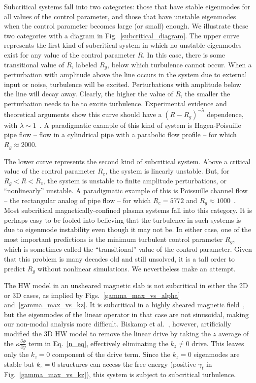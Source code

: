 \documentclass[twocolumn,showkeys,superscriptaddress]{revtex4}
\newcommand{\pdiff}[2]{\frac{\partial#1}{\partial#2}}
\begin{document}
Subcritical systems fall into two categories: those that have stable eigenmodes for all values of the control parameter, and those that have unstable eigenmodes
when the control parameter becomes large (or small) enough. We illustrate these two categories with a diagram in Fig.~\ref{subcritical_diagram}. 
The upper curve represents the first kind of subcritical system in which no unstable eigenmodes exist for any value of the control parameter $R$. In this
case, there is some transitional value of $R$, labeled $R_g$, below which turbulence cannot occur. When a perturbation with amplitude above the line occurs in the system due to external input or noise, 
turbulence will be excited. Perturbations with amplitude below the line will decay away. Clearly, the higher the value of $R$, the smaller the perturbation needs to be to excite turbulence.
Experimental evidence and theoretical arguments show this curve should have a $(R-R_g)^{-\lambda}$ dependence, with $\lambda \sim 1$~\cite{grossmann2000}.
A paradigmatic example of this kind of system is Hagen-Poisuille pipe flow -- flow in a cylindrical pipe with a parabolic flow profile -- for which $R_g \approx 2000$.

The lower curve represents the second kind of subcritical system. Above a critical value of the control parameter $R_c$, the system is linearly unstable. But, for $R_g < R < R_c$, the system is
unstable to finite amplitude perturbations, or ``nonlinearly'' unstable. A paradigmatic example of this is Poissuille channel flow -- the rectangular analog of pipe flow -- for which
$R_c = 5772$ and $R_g \approx 1000$~\cite{grossmann2000}. Most subcritical magnetically-confined plasma systems fall into this category. It is perhaps easy to be fooled into believing that the turbulence
in such systems is due to eigenmode instability even though it may not be. 
In either case, one of the most important predictions is the minimum turbulent control parameter $R_g$, which is sometimes called the ``transitional'' value of the control parameter. Given that this problem is many decades old
and still unsolved, it is a tall order to predict $R_g$ without nonlinear simulations. We nevertheless make an attempt.

The HW model in an unsheared magnetic slab is not subcritical in either the 2D or 3D cases, as implied by Figs.~\ref{gamma_max_vs_alpha} and~\ref{gamma_max_vs_kz}. It is subcritical in a highly sheared
magnetic field~\cite{drake1995}, but the eigenmodes of the linear operator in that case are not sinusoidal, making our non-modal analysis more difficult. 
Biskamp et al.~\cite{biskamp1995}, however, artificially modified the
3D HW model to remove the linear drive by taking the $z$ average of the $\kappa \pdiff{\phi}{y}$ term in Eq.~\ref{n_eq}, effectively eliminating the $k_z \ne 0$ drive. This leaves only the $k_z = 0$
component of the drive term. Since the $k_z = 0$ eigenmodes are stable but $k_z = 0$ structures can access the free energy (positive $\gamma_t$ in Fig.~\ref{gamma_max_vs_kz}), this system is subject
to subcritical turbulence.
\end{document}
